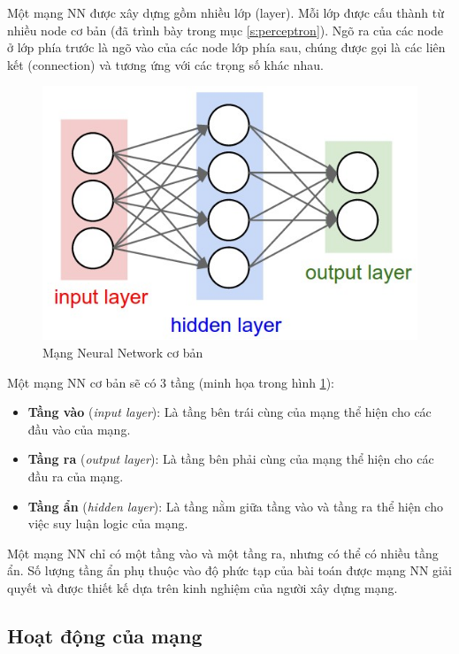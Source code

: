 Một mạng NN được xây dựng gồm nhiều lớp (layer). Mỗi lớp được cấu thành từ nhiều node cơ bản (đã trình bày trong mục \ref{s:perceptron}). Ngõ ra của các node ở lớp phía trước là ngõ vào của các node lớp phía sau, chúng được gọi là các liên kết (connection) và tương ứng với các trọng số khác nhau.

\FloatBarrier
\begin{figure}[htp]
\begin{center}
\includegraphics[scale=0.7]{chap2/c2_figs/structure_NN.PNG}
\end{center}
\caption{Mạng Neural Network cơ bản}
\label{fig:structure_NN}
\end{figure}
\FloatBarrier

Một mạng NN cơ bản sẽ có 3 tầng (minh họa trong hình \ref{fig:structure_NN}):
\begin{itemize}
\item \textbf{Tầng vào} (\textit{input layer}): Là tầng bên trái cùng của mạng thể hiện cho các đầu vào của mạng.
\item \textbf{Tầng ra} (\textit{output layer}): Là tầng bên phải cùng của mạng thể hiện cho các đầu ra của mạng.
\item \textbf{Tầng ẩn} (\textit{hidden layer}): Là tầng nằm giữa tầng vào và tầng ra thể hiện cho việc suy luận logic của mạng.
\end{itemize}

Một mạng NN chỉ có một tầng vào và một tầng ra, nhưng có thể có nhiều tầng ẩn. Số lượng tầng ẩn phụ thuộc vào độ phức tạp của bài toán được mạng NN giải quyết và được thiết kế dựa trên kinh nghiệm của người xây dựng mạng.

\subsection{Hoạt động của mạng}
\label{hoat_dong_cua_mang}

